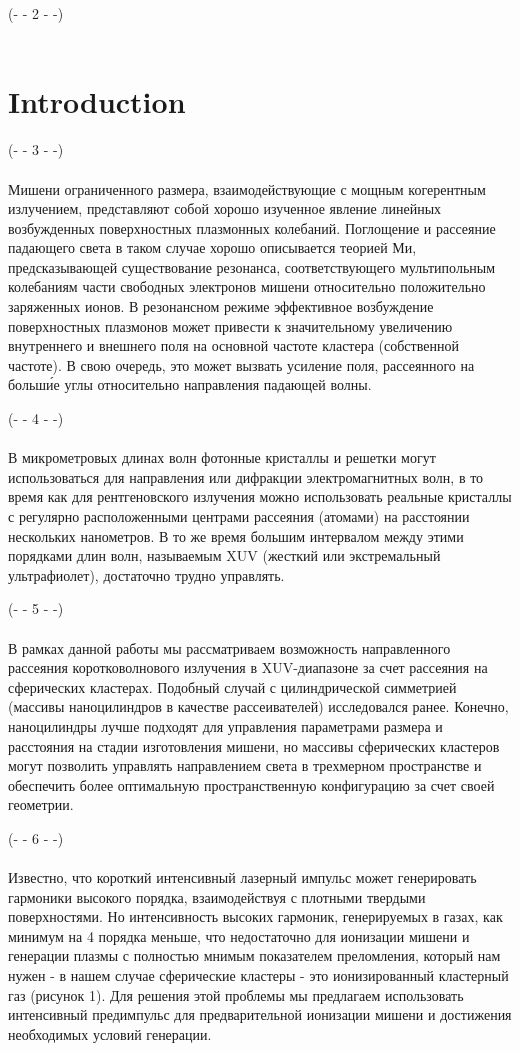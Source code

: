 \noindent(- - 2 - -)\\~\\

\section{Introduction}

\noindent(- - 3 - -)\\~\\
Мишени ограниченного размера, взаимодействующие с мощным когерентным излучением, представляют собой хорошо изученное явление линейных возбужденных поверхностных плазмонных колебаний. Поглощение и рассеяние падающего света в таком случае хорошо описывается теорией Ми, предсказывающей существование резонанса, соответствующего мультипольным колебаниям части свободных электронов мишени относительно положительно заряженных ионов. В резонансном режиме эффективное возбуждение поверхностных плазмонов может привести к значительному увеличению внутреннего и внешнего поля на основной частоте кластера (собственной частоте). В свою очередь, это может вызвать усиление поля, рассеянного на больш\'{и}е углы относительно направления падающей волны.

\noindent(- - 4 - -)\\~\\
В микрометровых длинах волн фотонные кристаллы и решетки могут использоваться для направления или дифракции электромагнитных волн, в то время как для рентгеновского излучения можно использовать реальные кристаллы с регулярно расположенными центрами рассеяния (атомами) на расстоянии нескольких нанометров. В то же время большим интервалом между этими порядками длин волн, называемым XUV (жесткий или экстремальный ультрафиолет), достаточно трудно управлять.

\noindent(- - 5 - -)\\~\\
В рамках данной работы мы рассматриваем возможность направленного рассеяния коротковолнового излучения в XUV-диапазоне за счет рассеяния на сферических кластерах. Подобный случай с цилиндрической симметрией (массивы наноцилиндров в качестве рассеивателей) исследовался ранее. Конечно, наноцилиндры лучше подходят для управления параметрами размера и расстояния на стадии изготовления мишени, но массивы сферических кластеров могут позволить управлять направлением света в трехмерном пространстве и обеспечить более оптимальную пространственную конфигурацию за счет своей геометрии.

\noindent(- - 6 - -)\\~\\
Известно, что короткий интенсивный лазерный импульс может генерировать гармоники высокого порядка, взаимодействуя с плотными твердыми поверхностями. Но интенсивность высоких гармоник, генерируемых в газах, как минимум на 4 порядка меньше, что недостаточно для ионизации мишени и генерации плазмы с полностью мнимым показателем преломления, который нам нужен - в нашем случае сферические кластеры - это ионизированный кластерный газ (рисунок 1). Для решения этой проблемы мы предлагаем использовать интенсивный предимпульс для предварительной ионизации мишени и достижения необходимых условий генерации.

